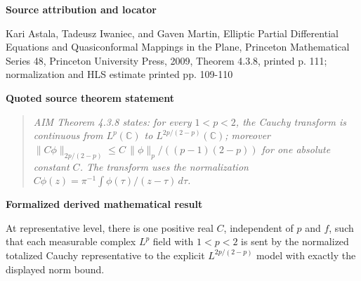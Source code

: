 \documentclass[10pt,oneside]{article}
\newenvironment{sourcequote}{\begin{quote}\itshape}{\end{quote}}
\newcommand{\reviewlabel}[1]{\par\smallskip\noindent\textsf{\bfseries #1}\par\smallskip}
\begin{document}
\reviewlabel{Source attribution and locator}
Kari Astala, Tadeusz Iwaniec, and Gaven Martin, Elliptic Partial Differential Equations and Quasiconformal Mappings in the Plane, Princeton Mathematical Series 48, Princeton University Press, 2009, Theorem 4.3.8, printed p. 111; normalization and HLS estimate printed pp. 109-110

\reviewlabel{Quoted source theorem statement}
\begin{sourcequote}
AIM Theorem 4.3.8 states: for every $1<p<2$, the Cauchy transform is continuous from $L^p(\mathbb C)$ to $L^{2p/(2-p)}(\mathbb C)$; moreover $\|C\phi\|_{2p/(2-p)}\leq C\,\|\phi\|_p/((p-1)(2-p))$ for one absolute constant $C$. The transform uses the normalization $C\phi(z)=\pi^{-1}\int\phi(\tau)/(z-\tau)\,d\tau$.
\end{sourcequote}

\reviewlabel{Formalized derived mathematical result}
At representative level, there is one positive real $C$, independent of $p$ and $f$, such that each measurable complex $L^p$ field with $1<p<2$ is sent by the normalized totalized Cauchy representative to the explicit $L^{2p/(2-p)}$ model with exactly the displayed norm bound.
\end{document}
